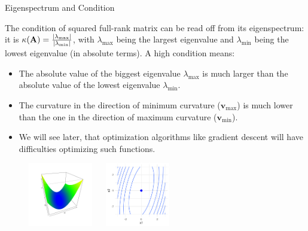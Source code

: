   \begin{vbframe}{Eigenspectrum and Condition}
  
  The condition of squared full-rank matrix can be read off from its eigenspectrum: it is $\kappa(\mathbf{A}) = \frac{|\lambda_\text{max}|}{|\lambda_\text{min}|}$, with $\lambda_\text{max}$ being the largest eigenvalue and $\lambda_\text{min}$ being the lowest eigenvalue (in absolute terms). A high condition means: 
  
  \begin{itemize}
    \item The absolute value of the biggest eigenvalue $\lambda_\text{max}$ is much larger than the absolute value of the lowest eigenvalue $\lambda_\text{min}$. 
    \item The curvature in the direction of minimum curvature ($\textbf{v}_\text{max}$) is much lower than the one in the direction of maximum curvature ($\textbf{v}_\text{min}$).
    \item We will see later, that optimization algorithms like gradient descent will have difficulties optimizing such functions. 
  \end{itemize}
  
  \vspace*{-0.3cm}
  
  \begin{figure}
    \includegraphics[height=0.25\textwidth, width = 0.25\textwidth]{figure_man/quadratic_functions_2D_bad_cond_1.png} ~~ \includegraphics[height=0.25\textwidth, width = 0.25\textwidth]{figure_man/quadratic_functions_2D_bad_cond_2.png}\\
    \begin{footnotesize} 
    \end{footnotesize}
  \end{figure}
  
  
  \end{vbframe}
  
